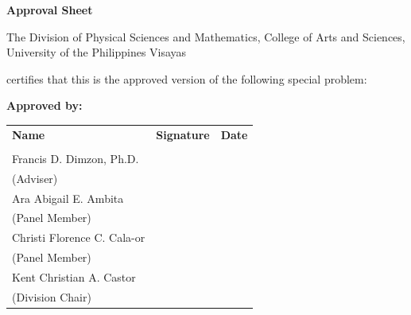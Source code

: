 
\begin{center}
\textbf{Approval Sheet}

The Division of Physical Sciences and Mathematics, College of Arts and Sciences, University of the Philippines Visayas

certifies that this is the approved version of the following special problem:

\end{center}

{\small\textbf{Approved by:}}

\begin{tabular}{lll}
\bfseries Name & \bfseries Signature & \bfseries Date\\ \\
Francis D. Dimzon, Ph.D. & \signaturerule & \signaturerule\\
\multicolumn{1}{l}{(Adviser)}\\
Ara Abigail E. Ambita & \signaturerule & \signaturerule\\
\multicolumn{1}{l}{(Panel Member)}\\
Christi Florence C. Cala-or & \signaturerule & \signaturerule\\
\multicolumn{1}{l}{(Panel Member)}\\
Kent Christian A. Castor & \signaturerule & \signaturerule\\
\multicolumn{1}{l}{(Division Chair)}
\end{tabular}
